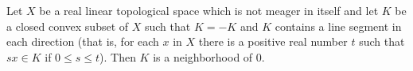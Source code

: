 Let $X$ be a real linear topological space which is not meager in itself and let $K$ be a closed convex subset of $X$ such that $K = -K$ and $K$ contains a line segment in each direction (that is, for each $x$ in $X$ there is a positive real number $t$ such that $sx \in K$ if $0 \leq s \leq t$). Then $K$ is a neighborhood of $0$.

